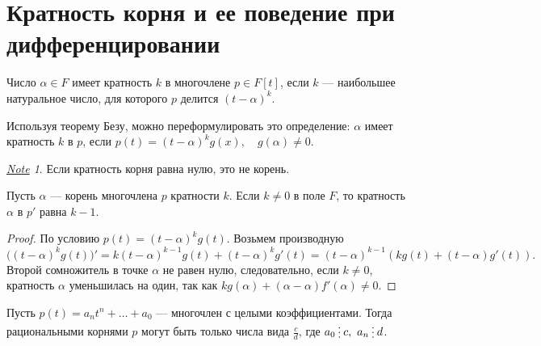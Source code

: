 \documentclass[11pt]{book}
\newcommand{\del}{{\:\small \raisebox{-2pt}{\vdots}\:}}
\theoremstyle{definition}
\theoremstyle{plain}
\theoremstyle{plain}
\theoremstyle{definition}
\theoremstyle{remark}
\newtheorem*{note}{\underline{Note}}
\begin{document}
\section{Кратность корня и ее поведение при дифференцировании}
 \begin{defn}
     Число $ \alpha \in F$ {\sf имеет кратность $ k$ в многочлене}  $ p \in F[t]$, если $ k$ --- наибольшее натуральное число, для которого  $ p $ делится  $ (t - \alpha)^{k}$. 

     Используя теорему Безу, можно переформулировать это определение: $ \alpha $ имеет кратность $ k$ в $p$, если  $ p(t) = (t-\alpha)^{k}g(x), \quad g(\alpha)\ne 0$.
 \end{defn}
 \begin{note}
     Если кратность корня равна нулю, это не корень.
 \end{note}
\begin{thm}
    Пусть $ \alpha $ --- корень многочлена $ p$ кратности  $ k$.
    Если $ k \ne 0$ в поле $ F$, то кратность  $ \alpha $ в $ p'$ равна $ k-1$.
\end{thm}
\begin{proof}
    По условию $ p(t) = (t- \alpha )^{k}g(t)$. 
    Возьмем производную 
    $$  \bigl((t- \alpha ) ^{ k} g(t)\bigr)' = k (t - \alpha )^{k-1} g(t) + (t- \alpha ) ^{k} g'(t) = (t - \alpha ) ^{k-1} (k g(t) + (t - \alpha ) g'(t)).$$
    Второй сомножитель в точке $ \alpha $ не равен нулю, следовательно, если $ k \ne 0$, кратность $ \alpha $ уменьшилась на один, так как $ kg(\alpha) + (\alpha-\alpha)f'(\alpha) \ne 0$.
\end{proof}
\begin{thm}
    Пусть $ p(t) = a_n t ^{n} + \ldots  + a_0$ --- многочлен с целыми коэффициентами. Тогда рациональными корнями $ p$ могут быть только числа вида  $ \frac{c}{d}$, где $ a_0 \del c, ~ a_n \del d$.
\end{thm}
\end{document}
